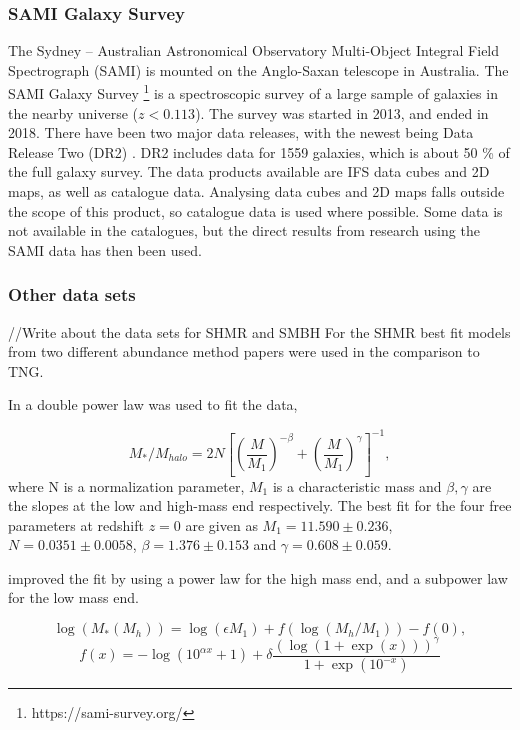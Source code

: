 \subsubsection{SAMI Galaxy Survey}
The Sydney – Australian Astronomical Observatory Multi-Object Integral Field Spectrograph (SAMI) is mounted on the Anglo-Saxan telescope in Australia. The SAMI Galaxy Survey \footnote{https://sami-survey.org/} is a spectroscopic survey of a large sample of galaxies in the nearby universe ($z < 0.113$). The survey was started in 2013, and ended in 2018. There have been two major data releases, with the newest being Data Release Two (DR2) \parencite{Scott2018}. DR2 includes data for 1559 galaxies, which is about 50 \% of the full galaxy survey. The data products available are IFS data cubes and 2D maps, as well as catalogue data. Analysing data cubes and 2D maps falls outside the scope of this product, so catalogue data is used where possible. Some data is not available in the catalogues, but the direct results from research using the SAMI data has then been used.


\subsubsection{Other data sets}
//Write about the data sets for SHMR and SMBH
For the SHMR best fit models from two different abundance method papers were used in the comparison to TNG.

In \cite{Moster2012} a double power law was used to fit the data,

\begin{equation}
	M_{*}/M_{halo} = 2 N[(\frac{M}{M_1})^{-\beta}+(\frac{M}{M_1})^{\gamma}]^{-1},
\end{equation}
where N is a normalization parameter, $M_1$ is a characteristic mass and $\beta, \gamma$ are the slopes at the low and high-mass end respectively. The best fit for the four free parameters at redshift $z=0$ are given as $M_1 = 11.590 \pm 0.236$, $N = 0.0351 \pm 0.0058$, $\beta = 1.376 \pm 0.153$ and $\gamma = 0.608 \pm 0.059$.

\cite{Behroozi2013} improved the fit by using a power law for the high mass end, and a subpower law for the low mass end.

\begin{equation}
    \log(M_*(M_h)) = \log(\epsilon M_1) + f(\log(M_h/M_1)) -f(0),
\end{equation}
\begin{equation*}
    f(x) = -\log(10^{\alpha x}+1)+\delta \frac{(\log(1+\exp(x)))^\gamma}{1 +\exp(10^{-x})}
\end{equation*}

